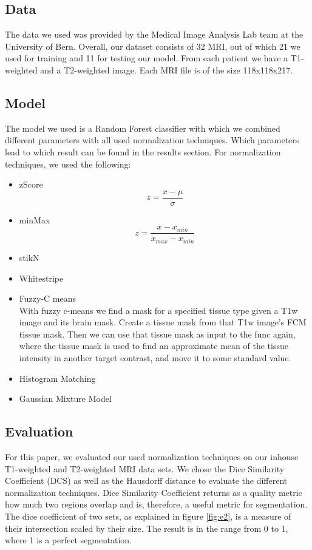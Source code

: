\documentclass[journal]{IEEEtran}
\begin{document}
\subsection{Data}
	The data we used was provided by the Medical Image Analysis Lab team at the University of Bern. Overall, our dataset consists of 32 MRI,
	out of which 21 we used for training and 11 for testing our model. From each patient we have a T1-weighted and a T2-weighted image. Each MRI file
	is of the size 118x118x217.
\subsection{Model}
	The model we used is a Random Forest classifier with which we combined different parameters with all used normalization techniques. Which parameters
	lead to which result can be found in the results section. For normalization techniques, we used the following:
	\begin{itemize}
		\item zScore
		\begin{equation}
			z = \frac{x - \mu}{\sigma}
		\end{equation}
		\item minMax
		\begin{equation}
			z = \frac{x - x_{min}}{x_{max} - x_{min}}
		\end{equation}
		\item stikN
		\item Whitestripe
		\item Fuzzy-C means\\
		With fuzzy c-means we find a mask for a specified tissue type given a T1w image and its brain mask. Create a tissue mask
		from that T1w image's FCM tissue mask. Then we can use that tissue mask as input to the func again, where the tissue mask is
		used to find an approximate mean of the tissue intensity in	another target contrast, and move it to some standard value.
		\item Histogram Matching
		\item Gaussian Mixture Model
	\end{itemize}
\subsection{Evaluation}
	For this paper, we evaluated our used normalization techniques on our inhouse T1-weighted and T2-weighted MRI data sets. 
	We chose the Dice Similarity Coefficient (DCS) as well as the Hausdorff distance to evaluate the different normalization techniques.
	Dice Similarity Coefficient returns as a quality metric how much two regions overlap and is, therefore, a useful metric for segmentation.
	The dice coefficient of two sets, as explained in figure \ref{fig:e2}, is a measure of their intersection scaled by their size. The result is in the range from 0 to 1, where 1 is a perfect segmentation. 
	
\end{document}
